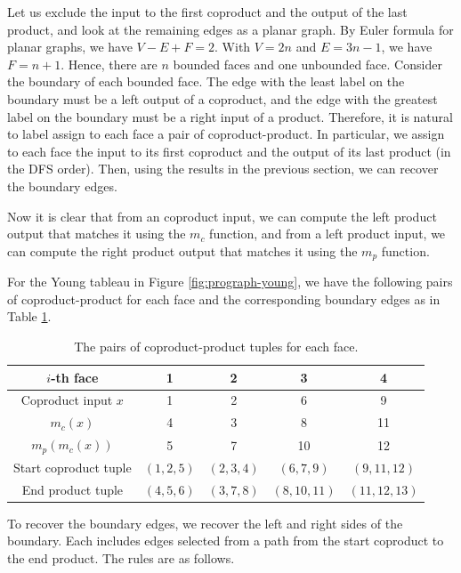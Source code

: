 Let us exclude the input to the first coproduct and the output of the last product, and look at the remaining edges as a planar graph. By Euler formula for planar graphs, we have $V-E+F=2$. With $V=2n$ and $E=3n-1$, we have $F=n+1$. Hence, there are $n$ bounded faces and one unbounded face. Consider the boundary of each bounded face. The edge with the least label on the boundary must be a left output of a coproduct, and the edge with the greatest label on the boundary must be a right input of a product. Therefore, it is natural to label assign to each face a pair of coproduct-product. In particular, we assign to each face the input to its first coproduct and the output of its last product (in the DFS order). Then, using the results in the previous section, we can recover the boundary edges.

Now it is clear that from an coproduct input, we can compute the left product output that matches it using the $m_c$ function, and from a left product input, we can compute the right product output that matches it using the $m_p$ function.

\begin{example}
  For the Young tableau in Figure \ref{fig:prograph-young}, we have the following pairs of coproduct-product for each face and the corresponding boundary edges as in Table \ref{tab:face-boundary}.
\end{example}

\begin{table}[ht]
  \begin{center}
    \begin{tabular*}{0.8\textwidth}{@{\extracolsep{\fill}}ccccc}
      $i$-th face & 1 & 2 & 3 & 4 \\
      \hline
      Coproduct input $x$ & 1 & 2 & 6 & 9 \\
      $m_c(x)$ & 4 & 3 & 8 & 11 \\
      $m_p(m_c(x))$ & 5 & 7 & 10 & 12 \\
      Start coproduct tuple & $(1,2,5)$ & $(2,3,4)$ & $(6,7,9)$ & $(9,11,12)$ \\
      End product tuple & $(4,5,6)$ & $(3,7,8)$ & $(8,10,11)$ & $(11,12,13)$ \\
    \end{tabular*}
  \end{center}
  \caption{The pairs of coproduct-product tuples for each face.}
  \label{tab:face-boundary}
\end{table}

To recover the boundary edges, we recover the left and right sides of the boundary. Each includes edges selected from a path from the start coproduct to the end product. The rules are as follows.

